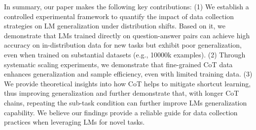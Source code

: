  In summary, our paper makes the following key contributions: (1) We establish a controlled experimental framework to quantify the impact of data collection strategies on LM generalization under distribution shifts. Based on it, we demonstrate that LMs trained directly on question-answer pairs can achieve high accuracy on in-distribution data for new tasks but exhibit poor generalization, even when trained on substantial datasets (e.g., 10000k examples). (2) Through systematic scaling experiments, we demonstrate that fine-grained CoT data enhances generalization and sample efficiency, even with limited training data. (3) We provide theoretical insights into how CoT helps to mitigate shortcut learning, thus improving generalization and further demonstrate that, with longer CoT chains, repeating the sub-task condition can further improve LMs generalization capability. We believe our findings provide a reliable guide for data collection practices when leveraging LMs for novel tasks.
